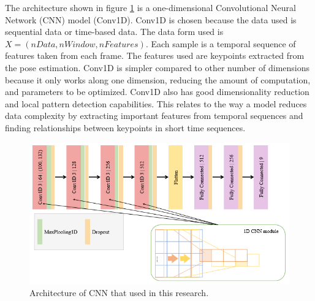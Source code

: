 The architecture shown in figure \ref{fig:CNNArch} is a one-dimensional Convolutional Neural Network (CNN) model (Conv1D). Conv1D is chosen because the data used is sequential data or time-based data. The data form used is \(X = (nData, nWindow, nFeatures)\). Each sample is a temporal sequence of features taken from each frame. The features used are keypoints extracted from the pose estimation. Conv1D is simpler compared to other number of dimensions because it only works along one dimension, reducing the amount of computation, and parameters to be optimized. Conv1D also has good dimensionality reduction and local pattern detection capabilities. This relates to the way a model reduces data complexity by extracting important features from temporal sequences and finding relationships between keypoints in short time sequences.

\begin{figure}[h!]
	\centering
	\includegraphics[width=\linewidth]{bab3/ar_CNNArch.png}
	\caption{Architecture of CNN that used in this research.}
	\label{fig:CNNArch}
\end{figure}

